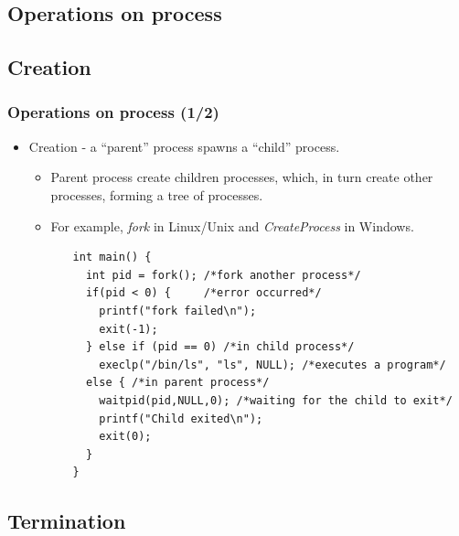 \documentclass[CJKutf8,xcolor=pdftex,dvipsnames,table]{beamer}
\begin{document}
\begin{CJK*}{UTF8}{song}
  \section{Operations on process}

  \subsection{Creation}
  
  \begin{frame}[fragile]
  \frametitle{Operations on process (1/2)} \pause
  \begin{itemize}
  \item{Creation \pause - a ``parent'' process spawns a ``child'' process.} \pause
    \begin{itemize}
    \item{Parent process create children processes, which, in turn create other processes, forming a tree of processes.} \pause
    \item{For example, \emph{fork} in Linux/Unix and \emph{CreateProcess} in Windows.} \pause
    \end{itemize}
  \end{itemize}
\begin{lstlisting}
          int main() {
            int pid = fork(); /*fork another process*/
            if(pid < 0) {     /*error occurred*/
              printf("fork failed\n");
              exit(-1);
            } else if (pid == 0) /*in child process*/
              execlp("/bin/ls", "ls", NULL); /*executes a program*/
            else { /*in parent process*/
              waitpid(pid,NULL,0); /*waiting for the child to exit*/
              printf("Child exited\n");
              exit(0);
            }
          }
\end{lstlisting}
	\end{frame}

  \subsection{Termination}


\end{CJK*}
\end{document}
